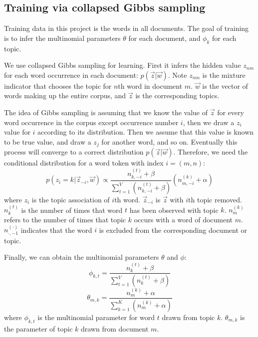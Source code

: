 \documentclass{article} %
\begin{document}
\subsection{Training via collapsed Gibbs sampling}
Training data in this project is the words in all documents. The goal of training is to infer the multinomial parameters $\theta$ for each document, and $\phi_{k}$ for each topic.
\par
We use collapsed Gibbs sampling for learning. First it infers the hidden value $z_{nm}$ for each word occurrence in each document: $p(\vec{z}|\vec{w})$. Note $z_{mn}$ is the mixture indicator that chooses the topic for $n$th word in document $m$. $\vec{w}$ is the vector of words making up the entire corpus, and $\vec{z}$ is the corresponding topics.
\par
The idea of Gibbs sampling is assuming that we know the value of $\vec{z}$ for every word occurrence in the corpus except occurrence number $i$, then we draw a $z_{i}$ value for $i$ according to its distribution. Then we assume that this value is known to be true value, and draw a $z_{j}$ for another word, and so on. Eventually this process will converge to a correct distribution $p(\vec{z}|\vec{w})$. Therefore, we need the conditional distribution for a word token with index $i=(m,n)$:
\begin{equation}
p(z_{i}=k|\vec{z}_{-i}, \vec{w}) \propto \frac{n^{(t)}_{k,-i}+\beta}{\sum_{t=1}^{V}(n^{(t)}_{k,-i}+\beta)}(n^{(k)}_{m,-i}+\alpha)
\label{e1}
\end{equation}
where $z_{i}$ is the topic association of $i$th word. $\vec{z}_{-i}$ is $\vec{z}$ with $i$th topic removed. $n^{(t)}_{k}$ is the number of times that word $t$ has been observed with topic $k$. $n^{(k)}_{m}$ refers to the number of times that topic $k$ occurs with a word of document $m$. $n^{(\cdot)}_{\cdot, -1}$ indicates that the word $i$ is excluded from the corresponding document or topic.
\par
Finally, we can obtain the multinomial parameters $\theta$ and $\phi$:
\begin{equation}
\phi_{k,t} = \frac{n^{(t)}_{k}+\beta}{\sum_{t=1}^{V}(n^{(t)}_{k}+\beta)}
\end{equation}
\begin{equation}
\theta_{m,k} = \frac{n^{(k)}_{m}+\alpha}{\sum_{k=1}^{K}(n^{(k)}_{m}+\alpha)}
\end{equation}
where $\phi_{k,t}$ is the multinomial parameter for word $t$ drawn from topic $k$. $\theta_{m,k}$ is the parameter of topic $k$ drawn from document $m$.
\end{document}
